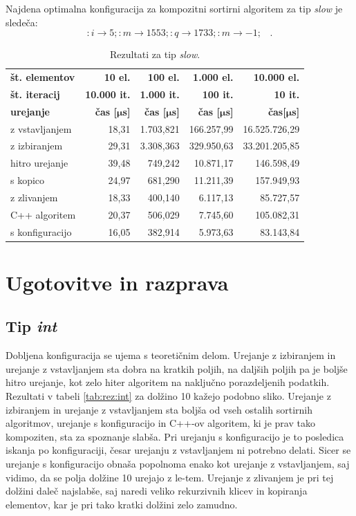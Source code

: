 \documentclass[a4paper,oneside,12pt]{article}
\newcommand{\lra}{\ensuremath{\longrightarrow}}
\newcommand{\edot}{\;\;\;.}
\newcommand{\bmu}{\ensuremath{\boldsymbol{\mu}}}
\newcommand{\usec}{\ensuremath{\bmu}s}
\begin{document}
Najdena optimalna konfiguracija za kompozitni sortirni algoritem za tip \emph{slow} je sledeča:
\[ :i \lra 5;:m \lra 1553;:q \lra 1733;:m \lra -1; \edot \]

\begin{table}[h]
  \centering
  \caption{Rezultati za tip \emph{slow}.}
  \label{tab:rez:slow} \vspace{1ex}
  \begin{tabular}{l!{\vrule width 1pt}r|r|r|r}
    \bf št. elementov & \bf 10 el.& \bf 100 el.& \bf 1.000 el. & \bf 10.000 el. \\ 
    \bf št. iteracij  & \bf 10.000 it. & \bf 1.000 it. & \bf 100 it. & \bf 10 it. \\ \hline
    \bf urejanje      & \bf čas [\usec] & \bf čas [\usec] & \bf čas [\usec] & \bf čas[\usec] \\  
    z vstavljanjem    & 18,31 & 1.703,821 & 166.257,99 & 16.525.726,29 \\ \hline
    z izbiranjem      & 29,31 & 3.308,363 & 329.950,63 & 33.201.205,85 \\ \hline
    hitro urejanje    & 39,48 &   749,242 &  10.871,17 &   146.598,49  \\ \hline
    s kopico          & 24,97 &   681,290 &  11.211,39 &   157.949,93  \\ \hline
    z zlivanjem       & 18,33 &   400,140 &   6.117,13 &    85.727,57  \\ \hline
    C++ algoritem     & 20,37 &   506,029 &   7.745,60 &   105.082,31  \\ \hline
    s konfiguracijo   & 16,05 &   382,914 &   5.973,63 &    83.143,84  \\ 
  \end{tabular}
\end{table}

\section{Ugotovitve in razprava}

\subsection{Tip \emph{int}}
Dobljena konfiguracija se ujema s teoretičnim delom. Urejanje z izbiranjem in urejanje z vstavljanjem sta 
dobra na kratkih poljih, na daljših poljih pa je boljše hitro urejanje, kot zelo hiter algoritem na naključno
porazdeljenih podatkih. 
Rezultati v tabeli \ref{tab:rez:int} za dolžino 10 kažejo podobno sliko. Urejanje z izbiranjem in urejanje 
z vstavljanjem sta boljša od vseh ostalih sortirnih algoritmov, urejanje s konfiguracijo in C++-ov 
algoritem, ki je prav tako kompoziten, sta za spoznanje slabša. Pri urejanju s konfiguracijo je to posledica
iskanja po konfiguraciji, česar urejanju z vstavljanjem ni potrebno delati. Sicer 
se urejanje s konfiguracijo obnaša popolnoma enako kot urejanje z vstavljanjem, saj vidimo, da se polja dolžine 
10 urejajo z le-tem. Urejanje z zlivanjem je pri tej dolžini daleč najslabše, saj naredi veliko 
rekurzivnih klicev in kopiranja elementov, kar je pri tako kratki dolžini zelo zamudno.
\end{document}
